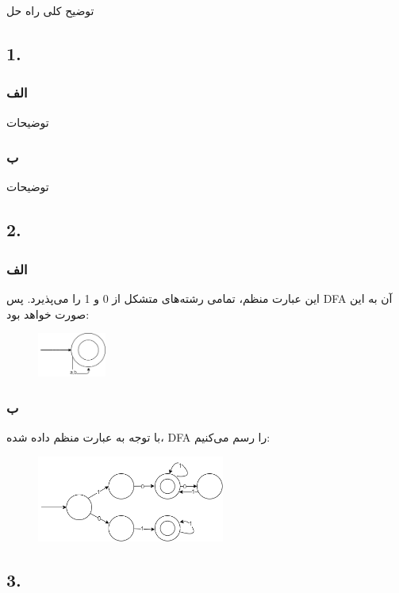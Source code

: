 توضیح کلی راه حل

\subsection*{1.}
\subsubsection*{الف}

توضیحات

\subsubsection*{ب}

توضیحات

\subsection*{2.}
\subsubsection*{الف}
این عبارت منظم، تمامی رشته‌های متشکل از 0 و 1 را می‌پذیرد. پس DFA آن به این صورت خواهد بود:

\begin{figure}[htbp]
	\centering
	\includegraphics[width=0.20\textwidth]{q3s2p1.png}
\end{figure}



\subsubsection*{ب}
با توجه به عبارت منظم داده شده، DFA را رسم می‌کنیم:
\begin{figure}[htbp]
	\centering
	\includegraphics[width=0.55\textwidth]{q3s2p2.png}
\end{figure}

\subsection*{3.}
